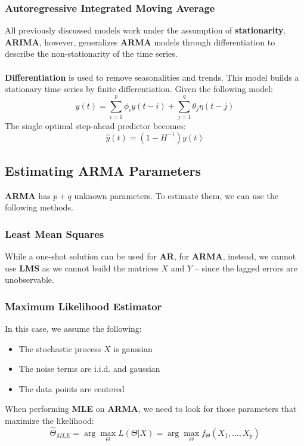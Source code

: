 \documentclass{article}
\begin{document}
\subsubsection{Autoregressive Integrated Moving Average}
All previously discussed models work under the assumption of \textbf{stationarity}. \textbf{ARIMA}, however, generalizes \textbf{ARMA} models through differentiation to describe the non-stationarity of the time series. \\ \\
\textbf{Differentiation} is used to remove seasonalities and trends. This model builds a stationary time series by finite differentiation. Given the following model:
\[ y (t) = \displaystyle\sum^p_{i = 1} \phi_i y(t-i) + \displaystyle\sum^q_{j=1} \theta_j \eta(t - j) \]
The single optimal step-ahead predictor becomes:
\[ \hat y (t) = \left( 1 - H^{-1} \right) y(t) \]

\subsection{Estimating ARMA Parameters}
\textbf{ARMA} has $p + q$ unknown parameters. To estimate them, we can use the following methods.

\subsubsection{Least Mean Squares}
While a one-shot solution can be used for \textbf{AR}, for \textbf{ARMA}, instead, we cannot use \textbf{LMS} as we cannot build the matrices $X$ and $Y$ -- since the lagged errors are unobservable.

\subsubsection{Maximum Likelihood Estimator}
In this case, we assume the following:

\begin{itemize}
	\item The stochastic process $X$ is gaussian
	\item The noise terms are i.i.d. and gaussian
	\item The data points are centered
\end{itemize}
When performing \textbf{MLE} on \textbf{ARMA}, we need to look for those parameters that maximize the likelihood:
\[ \hat\Theta_{MLE} = \displaystyle\arg\max_\Theta L(\Theta|X) = \arg\max_\Theta f_\Theta(X_1, \dots, X_p) \]
\end{document}
